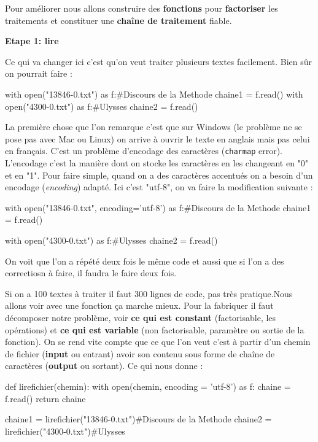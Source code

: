 Pour améliorer nous allons construire des \textbf{fonctions} pour
\textbf{factoriser} les traitements et constituer une \textbf{chaîne
de traitement} fiable.

\textbf{Etape 1: lire}

Ce qui va changer ici c'est qu'on veut traiter plusieurs textes facilement.
Bien sûr on pourrait faire :

\begin{python} with open("13846-0.txt") as f:\#Discours de la Methode
chaine1 = f.read() with open("4300-0.txt") as f:\#Ulysses chaine2
= f.read() \end{python} La première chose que l'on remarque c'est
que sur Windows (le problème ne se pose pas avec Mac ou Linux) on
arrive à ouvrir le texte en anglais mais pas celui en français. C'est
un problème d'encodage des caractères (\texttt{charmap} error). L'encodage
c'est la manière dont on stocke les caractères en les changeant en
"0" et en "1". Pour faire simple, quand on a des caractères accentués
on a besoin d'un encodage (\textit{encoding}) adapté. Ici c'est "utf-8",
on va faire la modification suivante : \begin{python} with open("13846-0.txt",
encoding='utf-8') as f:\#Discours de la Methode chaine1 = f.read()

with open("4300-0.txt") as f:\#Ulysses chaine2 = f.read() \end{python}

On voit que l'on a répété deux fois le même code et aussi que si l'on
a des correctiosn à faire, il faudra le faire deux fois.

Si on a 100 textes à traiter il faut 300 lignes de code, pas très
pratique.Nous allons voir avec une fonction ça marche mieux. Pour
la fabriquer il faut décomposer notre problème, voir \textbf{ce qui
est constant} (factorisable, les opérations) et \textbf{ce qui est
variable} (non factorisable, paramètre ou sortie de la fonction).
On se rend vite compte que ce que l'on veut c'est à partir d'un chemin
de fichier (\textbf{input} ou entrant) avoir son contenu sous forme
de chaîne de caractères (\textbf{output} ou sortant). Ce qui nous
donne :

\begin{python} def lirefichier(chemin): with open(chemin, encoding
= 'utf-8') as f: chaine = f.read() return chaine

chaine1 = lirefichier("13846-0.txt")\#Discours de la Methode chaine2
= lirefichier("4300-0.txt")\#Ulysses

\end{python}

